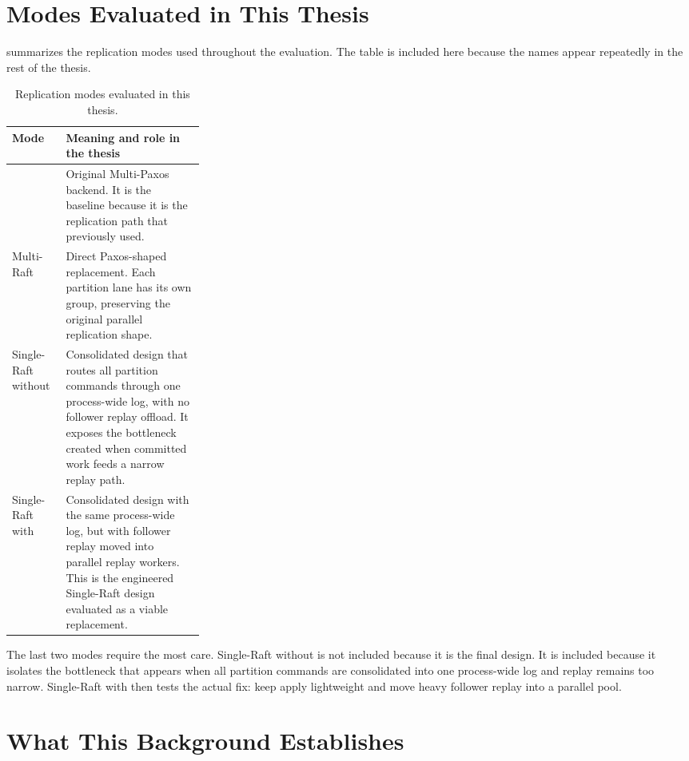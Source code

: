 \section{Modes Evaluated in This Thesis}

 summarizes the replication modes used throughout the
evaluation. The table is included here because the names appear repeatedly in
the rest of the thesis.

\begin{table}[htbp]
\centering
\caption[Replication modes]{Replication modes evaluated in this thesis.}
\label{tab:modes}
\small
\begin{tabularx}{\linewidth}{@{}>{\raggedright\arraybackslash}p{0.28\linewidth}>{\raggedright\arraybackslash}X@{}}
\toprule
Mode & Meaning and role in the thesis \\
\midrule
\Paxos{} & Original Multi-Paxos backend. It is the baseline because it is the replication path that \Mako{} previously used. \\
Multi-Raft & Direct Paxos-shaped \Raft{} replacement. Each partition lane has its own \Raft{} group, preserving the original parallel replication shape. \\
Single-Raft without \ReplayPool{} & Consolidated \Raft{} design that routes all partition commands through one process-wide \Raft{} log, with no follower replay offload. It exposes the bottleneck created when committed work feeds a narrow replay path. \\
Single-Raft with \ReplayPool{} & Consolidated \Raft{} design with the same process-wide \Raft{} log, but with follower replay moved into parallel replay workers. This is the engineered Single-Raft design evaluated as a viable replacement. \\
\bottomrule
\end{tabularx}
\end{table}

The last two modes require the most care. Single-Raft without \ReplayPool{} is
not included because it is the final design. It is included because it isolates
the bottleneck that appears when all partition commands are consolidated into
one process-wide \Raft{} log and replay remains too narrow. Single-Raft with
\ReplayPool{} then tests the actual fix: keep \Raft{} apply lightweight and
move heavy follower replay into a parallel pool.

\section{What This Background Establishes}

